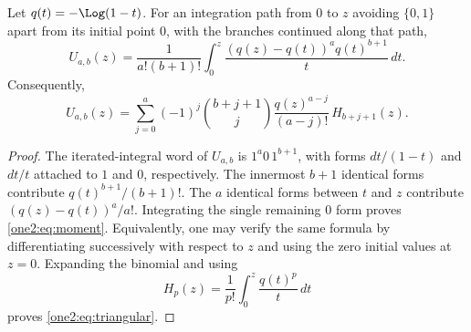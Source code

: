 \begin{lemma}
\label{one2:lem:moment}
Let $q(t)=-\Log(1-t)$.  For an integration path from $0$ to $z$ avoiding
$\{0,1\}$ apart from its initial point $0$, with the branches
continued along that path,
\begin{equation}
 U_{a,b}(z)=\frac1{a!(b+1)!}
 \int_0^z\frac{(q(z)-q(t))^a q(t)^{b+1}}{t}\,dt.
 \label{one2:eq:moment}
\end{equation}
Consequently,
\begin{equation}
 U_{a,b}(z)=\sum_{j=0}^a(-1)^j
 \binom{b+j+1}{j}\frac{q(z)^{a-j}}{(a-j)!}\,H_{b+j+1}(z).
 \label{one2:eq:triangular}
\end{equation}
\end{lemma}
\begin{proof}
The iterated-integral word of $U_{a,b}$ is
$1^a0\,1^{b+1}$, with forms $dt/(1-t)$ and $dt/t$ attached to $1$ and
$0$, respectively.  The innermost $b+1$ identical forms contribute
$q(t)^{b+1}/(b+1)!$.  The $a$ identical forms between $t$ and $z$
contribute $(q(z)-q(t))^a/a!$.  Integrating the single remaining $0$
form proves \eqref{one2:eq:moment}.  Equivalently, one may verify the
same formula by differentiating successively with respect to $z$ and
using the zero initial values at $z=0$.  Expanding the binomial and
using
\[
 H_p(z)=\frac1{p!}\int_0^z\frac{q(t)^p}{t}\,dt
\]
proves \eqref{one2:eq:triangular}.
\end{proof}

